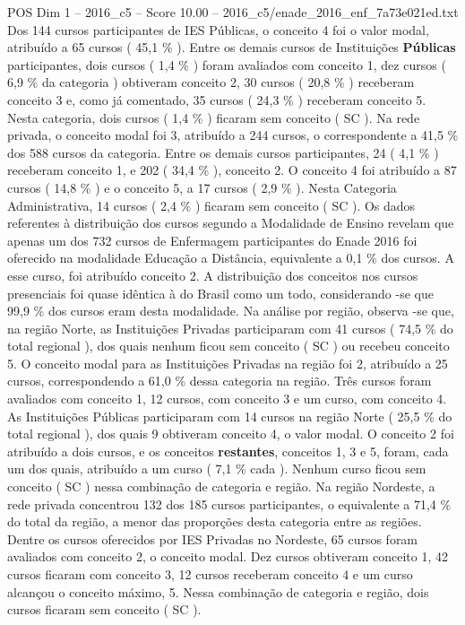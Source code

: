 \begin{textsample}{POS Dim 1 – 2016\_c5 – Score 10.00 – 2016\_c5/enade\_2016\_enf\_7a73e021ed.txt}
Dos 144 cursos participantes de IES Públicas, o conceito 4 foi o valor modal, atribuído a 65 cursos ( 45,1 \% ).
Entre os demais cursos de Instituições \textbf{Públicas} participantes, dois cursos ( 1,4 \% ) foram avaliados com conceito 1, dez cursos ( 6,9 \% da categoria ) obtiveram conceito 2, 30 cursos ( 20,8 \% ) receberam conceito 3 e, como já comentado, 35 cursos ( 24,3 \% ) receberam conceito 5.
Nesta categoria, dois cursos ( 1,4 \% ) ficaram sem conceito ( SC ).
Na rede privada, o conceito modal foi 3, atribuído a 244 cursos, o correspondente a 41,5 \% dos 588 cursos da categoria.
Entre os demais cursos participantes, 24 ( 4,1 \% ) receberam conceito 1, e 202 ( 34,4 \% ), conceito 2.
O conceito 4 foi atribuído a 87 cursos ( 14,8 \% ) e o conceito 5, a 17 cursos ( 2,9 \% ).
Nesta Categoria Administrativa, 14 cursos ( 2,4 \% ) ficaram sem conceito ( SC ).
Os dados referentes à distribuição dos cursos segundo a Modalidade de Ensino revelam que apenas um dos 732 cursos de Enfermagem participantes do Enade 2016 foi oferecido na modalidade Educação a Distância, equivalente a 0,1 \% dos cursos.
A esse curso, foi atribuído conceito 2.
A distribuição dos conceitos nos cursos presenciais foi quase idêntica à do Brasil como um todo, considerando -se que 99,9 \% dos cursos eram desta modalidade.
Na análise por região, observa -se que, na região Norte, as Instituições Privadas participaram com 41 cursos ( 74,5 \% do total regional ), dos quais nenhum ficou sem conceito ( SC ) ou recebeu conceito 5.
O conceito modal para as Instituições Privadas na região foi 2, atribuído a 25 cursos, correspondendo a 61,0 \% dessa categoria na região.
Três cursos foram avaliados com conceito 1, 12 cursos, com conceito 3 e um curso, com conceito 4.
As Instituições Públicas participaram com 14 cursos na região Norte ( 25,5 \% do total regional ), dos quais 9 obtiveram conceito 4, o valor modal.
O conceito 2 foi atribuído a dois cursos, e os conceitos \textbf{restantes}, conceitos 1, 3 e 5, foram, cada um dos quais, atribuído a um curso ( 7,1 \% cada ).
Nenhum curso ficou sem conceito ( SC ) nessa combinação de categoria e região.
Na região Nordeste, a rede privada concentrou 132 dos 185 cursos participantes, o equivalente a 71,4 \% do total da região, a menor das proporções desta categoria entre as regiões.
Dentre os cursos oferecidos por IES Privadas no Nordeste, 65 cursos foram avaliados com conceito 2, o conceito modal.
Dez cursos obtiveram conceito 1, 42 cursos ficaram com conceito 3, 12 cursos receberam conceito 4 e um curso alcançou o conceito máximo, 5.
Nessa combinação de categoria e região, dois cursos ficaram sem conceito ( SC ).

\end{textsample}

